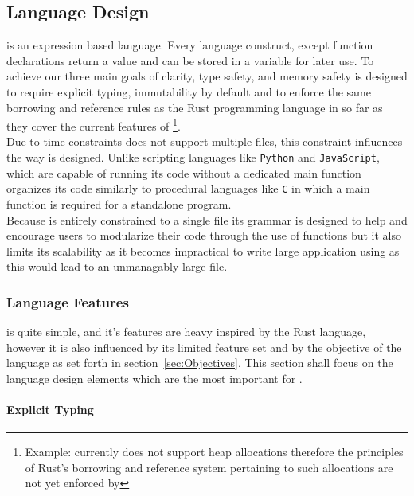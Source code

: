 \subsection{Language Design}
\label{sec:LanguageDesign}

\lang{} is an expression based language. Every language construct, except function
declarations return a value and can be stored in a variable for later use. To achieve
our three main goals of clarity, type safety, and memory safety \lang{} is designed
to require explicit typing, immutability by default and to enforce the same
borrowing and reference rules as the Rust programming language in so far as they
cover the current features of \lang\footnote{Example: \lang{} currently does not
support heap allocations therefore the principles of Rust's borrowing and reference
system pertaining to such allocations are not yet enforced by \lang{}}.\\

Due to time constraints \lang{} does not support multiple files, this constraint
influences the way \lang{} is designed. Unlike scripting languages like
\texttt{Python} and \texttt{JavaScript}, which are capable of running its code without
a dedicated main function \lang{} organizes its code similarly to procedural
languages like \texttt{C} in which a main function is required for a standalone
program. \\

Because \lang{} is entirely constrained to a single file its grammar is designed to
help and encourage users to modularize their code through the use of functions but it
also limits its scalability as it becomes impractical to write large application
using \lang{} as this would lead to an unmanagably large file. 

\subsubsection{Language Features}
\label{sec:Grammar}

\lang{} is quite simple, and it's features are heavy inspired by the
Rust language\cite{RUST}, however it is also influenced by its limited feature set and
by the objective of the language as set forth in section~\ref{sec:Objectives}. This
section shall focus on the language design elements which are the most important for
\lang{}.

\paragraph{Explicit Typing} \hfill
\vspace{0.1em}

